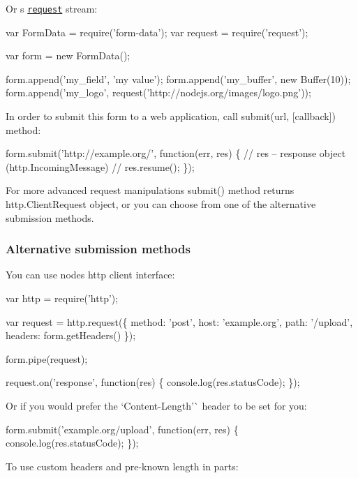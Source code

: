 Or \textquotesingle{}s \href{https://github.com/request/request}{\tt request} stream\+:


\begin{DoxyCode}
var FormData = require('form-data');
var request = require('request');

var form = new FormData();

form.append('my\_field', 'my value');
form.append('my\_buffer', new Buffer(10));
form.append('my\_logo', request('http://nodejs.org/images/logo.png'));
\end{DoxyCode}


In order to submit this form to a web application, call {\ttfamily submit(url, \mbox{[}callback\mbox{]})} method\+:


\begin{DoxyCode}
form.submit('http://example.org/', function(err, res) \{
  // res – response object (http.IncomingMessage)  //
  res.resume();
\});
\end{DoxyCode}


For more advanced request manipulations {\ttfamily submit()} method returns {\ttfamily http.\+Client\+Request} object, or you can choose from one of the alternative submission methods.

\subsubsection*{Alternative submission methods}

You can use node\textquotesingle{}s http client interface\+:


\begin{DoxyCode}
var http = require('http');

var request = http.request(\{
  method: 'post',
  host: 'example.org',
  path: '/upload',
  headers: form.getHeaders()
\});

form.pipe(request);

request.on('response', function(res) \{
  console.log(res.statusCode);
\});
\end{DoxyCode}


Or if you would prefer the `\textquotesingle{}Content-\/\+Length'\`{} header to be set for you\+:


\begin{DoxyCode}
form.submit('example.org/upload', function(err, res) \{
  console.log(res.statusCode);
\});
\end{DoxyCode}


To use custom headers and pre-\/known length in parts\+:


